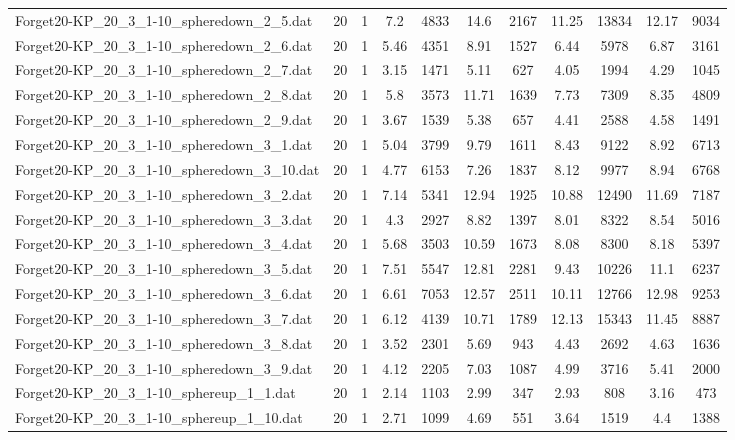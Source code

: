 \begin{table}[!ht]
\begin{tabular}{lcccccccccc}
Forget20-KP\_20\_3\_1-10\_spheredown\_2\_5.dat & 20 & 1 & 7.2 & 4833 & 14.6 & 2167 & 11.25 & 13834 & 12.17 & 9034 \\
Forget20-KP\_20\_3\_1-10\_spheredown\_2\_6.dat & 20 & 1 & 5.46 & 4351 & 8.91 & 1527 & 6.44 & 5978 & 6.87 & 3161 \\
Forget20-KP\_20\_3\_1-10\_spheredown\_2\_7.dat & 20 & 1 & 3.15 & 1471 & 5.11 & 627 & 4.05 & 1994 & 4.29 & 1045 \\
Forget20-KP\_20\_3\_1-10\_spheredown\_2\_8.dat & 20 & 1 & 5.8 & 3573 & 11.71 & 1639 & 7.73 & 7309 & 8.35 & 4809 \\
Forget20-KP\_20\_3\_1-10\_spheredown\_2\_9.dat & 20 & 1 & 3.67 & 1539 & 5.38 & 657 & 4.41 & 2588 & 4.58 & 1491 \\
Forget20-KP\_20\_3\_1-10\_spheredown\_3\_1.dat & 20 & 1 & 5.04 & 3799 & 9.79 & 1611 & 8.43 & 9122 & 8.92 & 6713 \\
Forget20-KP\_20\_3\_1-10\_spheredown\_3\_10.dat & 20 & 1 & 4.77 & 6153 & 7.26 & 1837 & 8.12 & 9977 & 8.94 & 6768 \\
Forget20-KP\_20\_3\_1-10\_spheredown\_3\_2.dat & 20 & 1 & 7.14 & 5341 & 12.94 & 1925 & 10.88 & 12490 & 11.69 & 7187 \\
Forget20-KP\_20\_3\_1-10\_spheredown\_3\_3.dat & 20 & 1 & 4.3 & 2927 & 8.82 & 1397 & 8.01 & 8322 & 8.54 & 5016 \\
Forget20-KP\_20\_3\_1-10\_spheredown\_3\_4.dat & 20 & 1 & 5.68 & 3503 & 10.59 & 1673 & 8.08 & 8300 & 8.18 & 5397 \\
Forget20-KP\_20\_3\_1-10\_spheredown\_3\_5.dat & 20 & 1 & 7.51 & 5547 & 12.81 & 2281 & 9.43 & 10226 & 11.1 & 6237 \\
Forget20-KP\_20\_3\_1-10\_spheredown\_3\_6.dat & 20 & 1 & 6.61 & 7053 & 12.57 & 2511 & 10.11 & 12766 & 12.98 & 9253 \\
Forget20-KP\_20\_3\_1-10\_spheredown\_3\_7.dat & 20 & 1 & 6.12 & 4139 & 10.71 & 1789 & 12.13 & 15343 & 11.45 & 8887 \\
Forget20-KP\_20\_3\_1-10\_spheredown\_3\_8.dat & 20 & 1 & 3.52 & 2301 & 5.69 & 943 & 4.43 & 2692 & 4.63 & 1636 \\
Forget20-KP\_20\_3\_1-10\_spheredown\_3\_9.dat & 20 & 1 & 4.12 & 2205 & 7.03 & 1087 & 4.99 & 3716 & 5.41 & 2000 \\
Forget20-KP\_20\_3\_1-10\_sphereup\_1\_1.dat & 20 & 1 & 2.14 & 1103 & 2.99 & 347 & 2.93 & 808 & 3.16 & 473 \\
Forget20-KP\_20\_3\_1-10\_sphereup\_1\_10.dat & 20 & 1 & 2.71 & 1099 & 4.69 & 551 & 3.64 & 1519 & 4.4 & 1388 \\

\end{tabular}
\end{table}
